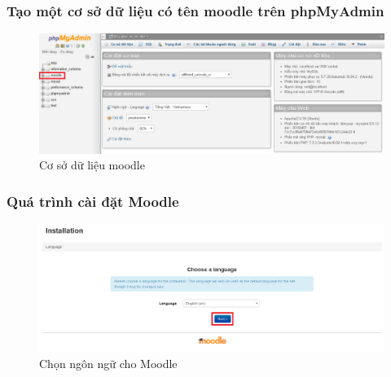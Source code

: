 \subsubsection{Tạo một cơ sở dữ liệu có tên moodle trên phpMyAdmin}

\begin{center}
	\begin{figure}[htp]
		\begin{center}
			\includegraphics[width=1.3\linewidth]{img/dbmoodle}
		\end{center}
		\caption{Cơ sở dữ liệu moodle}
		\label{refhinh29}
	\end{figure}
\end{center}

\newpage
\subsubsection{Quá trình cài đặt Moodle}

\begin{center}
	\begin{figure}[htp]
		\begin{center}
			\includegraphics[width=1\linewidth]{img/choosenn}
		\end{center}
		\caption{Chọn ngôn ngữ cho Moodle}
		\label{refhinh30}
	\end{figure}
\end{center}

